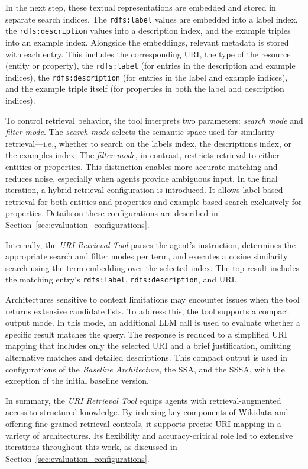 \documentclass[a4paper,oneside,bibliography=totoc]{scrbook}
\begin{document}
In the next step, these textual representations are embedded and stored in separate search indices. The \texttt{rdfs:label} values are embedded into a label index, the \texttt{rdfs:description} values into a description index, and the example triples into an example index. Alongside the embeddings, relevant metadata is stored with each entry. This includes the corresponding URI, the type of the resource (entity or property), the \texttt{rdfs:label} (for entries in the description and example indices), the \texttt{rdfs:description} (for entries in the label and example indices), and the example triple itself (for properties in both the label and description indices).

To control retrieval behavior, the tool interprets two parameters: \textit{search mode} and \textit{filter mode}. The \textit{search mode} selects the semantic space used for similarity retrieval—i.e., whether to search on the labels index, the descriptions index, or the examples index. The \textit{filter mode}, in contrast, restricts retrieval to either entities or properties. This distinction enables more accurate matching and reduces noise, especially when agents provide ambiguous input. In the final iteration, a hybrid retrieval configuration is introduced. It allows label-based retrieval for both entities and properties and example-based search exclusively for properties. Details on these configurations are described in Section~\ref{sec:evaluation_configurations}.

Internally, the \textit{URI Retrieval Tool} parses the agent’s instruction, determines the appropriate search and filter modes per term, and executes a cosine similarity search using the term embedding over the selected index. The top result includes the matching entry’s \texttt{rdfs:label}, \texttt{rdfs:description}, and URI.

Architectures sensitive to context limitations may encounter issues when the tool returns extensive candidate lists. To address this, the tool supports a compact output mode. In this mode, an additional \ac{LLM} call is used to evaluate whether a specific result matches the query. The response is reduced to a simplified URI mapping that includes only the selected URI and a brief justification, omitting alternative matches and detailed descriptions. This compact output is used in configurations of the \textit{Baseline Architecture}, the \ac{SSA}, and the \ac{SSSA}, with the exception of the initial baseline version.

In summary, the \textit{URI Retrieval Tool} equips agents with retrieval-augmented access to structured knowledge. By indexing key components of Wikidata and offering fine-grained retrieval controls, it supports precise URI mapping in a variety of architectures. Its flexibility and accuracy-critical role led to extensive iterations throughout this work, as discussed in Section~\ref{sec:evaluation_configurations}.
\end{document}

